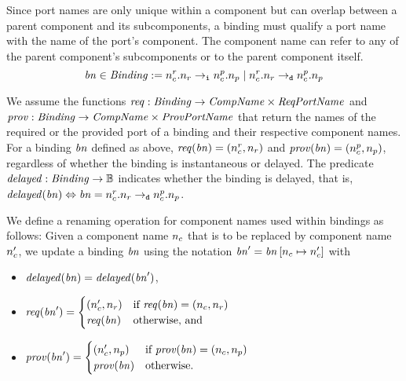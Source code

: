 \documentclass[a4paper,10pt,english]{article}
\begin{document}
Since port names are only unique within a component but can overlap between a parent component and its subcomponents, a
binding must qualify a port name with the name of the port's component. The component name can refer to any of the parent
component's subcomponents or to the parent component itself.
\begin{equation*} 
	\mathit{bn} \in \mathit{Binding} :=
		n_c^r\mathtt{.}n_r \; \mathtt{\rightarrow_i} \; n_c^p\mathtt{.}n_p
		\mid
		n_c^r\mathtt{.}n_r \; \mathtt{\rightarrow_d} \; n_c^p\mathtt{.}n_p
\end{equation*}

We assume the functions $\mathit{req} : \mathit{Binding} \rightarrow \mathit{CompName} \times \mathit{ReqPortName}$ and $\mathit{prov} : \mathit{Binding} \rightarrow \mathit{CompName}
\times \mathit{ProvPortName}$ that return the names of the required or the provided port of a binding and their respective component
names.
For a binding $\mathit{bn}$ defined as above, $\mathit{req}(\mathit{bn}) = (n_c^r, n_r)$ and $\mathit{prov}(\mathit{bn}) = (n_c^p,
n_p)$, regardless of whether the binding is instantaneous or delayed. The predicate $\mathit{delayed} : \mathit{Binding} \rightarrow
\mathbb{B}$ indicates whether the binding is delayed, that is, $\mathit{delayed}(\mathit{bn}) \Leftrightarrow \mathit{bn} =
n_c^r\mathtt{.}n_r \; \mathtt{\rightarrow_d} \; n_c^p\mathtt{.}n_p$.

We define a renaming operation for component names used within bindings as follows: Given a component name $n_c$ that is
to be replaced by component name $n_c'$, we update a binding $\mathit{bn}$ using the notation $\mathit{bn}' =
\mathit{bn}\left[n_c\mapsto n_c'\right]$ with 
\begin{itemize}
	\item $\mathit{delayed}(\mathit{bn}) = \mathit{delayed}(\mathit{bn}')$,
	\item $\mathit{req}(\mathit{bn}') = 
		\begin{cases}
			(n_c', n_r) & \text{if } \mathit{req}(\mathit{bn}) = (n_c, n_r) \\
			\mathit{req}(\mathit{bn}) & \text{otherwise, and}
		\end{cases}$
	\item $\mathit{prov}(\mathit{bn}') = 
		\begin{cases}
			(n_c', n_p) & \text{if } \mathit{prov}(\mathit{bn}) = (n_c, n_p) \\
			\mathit{prov}(\mathit{bn}) & \text{otherwise.}
		\end{cases}$
\end{itemize}
\end{document}
